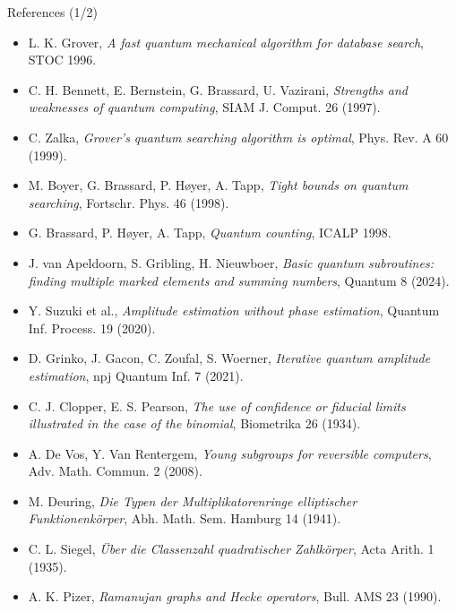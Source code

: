 \documentclass[aspectratio=169,10pt]{beamer}
\begin{document}
\begin{frame}{References (1/2)}
\scriptsize
\begin{itemize}\setlength{\itemsep}{1pt}
\item L. K. Grover, \emph{A fast quantum mechanical algorithm for database search}, STOC 1996.
\item C. H. Bennett, E. Bernstein, G. Brassard, U. Vazirani, \emph{Strengths and weaknesses of quantum computing}, SIAM J. Comput. 26 (1997).
\item C. Zalka, \emph{Grover's quantum searching algorithm is optimal}, Phys. Rev. A 60 (1999).
\item M. Boyer, G. Brassard, P. H{\o}yer, A. Tapp, \emph{Tight bounds on quantum searching}, Fortschr. Phys. 46 (1998).
\item G. Brassard, P. H{\o}yer, A. Tapp, \emph{Quantum counting}, ICALP 1998.
\item J. van Apeldoorn, S. Gribling, H. Nieuwboer, \emph{Basic quantum subroutines: finding multiple marked elements and summing numbers}, Quantum 8 (2024).
\item Y. Suzuki et al., \emph{Amplitude estimation without phase estimation}, Quantum Inf. Process. 19 (2020).
\item D. Grinko, J. Gacon, C. Zoufal, S. Woerner, \emph{Iterative quantum amplitude estimation}, npj Quantum Inf. 7 (2021).
\item C. J. Clopper, E. S. Pearson, \emph{The use of confidence or fiducial limits illustrated in the case of the binomial}, Biometrika 26 (1934).
\item A. De Vos, Y. Van Rentergem, \emph{Young subgroups for reversible computers}, Adv. Math. Commun. 2 (2008).
\item M. Deuring, \emph{Die Typen der Multiplikatorenringe elliptischer Funktionenk\"orper}, Abh. Math. Sem. Hamburg 14 (1941).
\item C. L. Siegel, \emph{\"Uber die Classenzahl quadratischer Zahlk\"orper}, Acta Arith. 1 (1935).
\item A. K. Pizer, \emph{Ramanujan graphs and Hecke operators}, Bull. AMS 23 (1990).
\end{itemize}
\end{frame}
\end{document}
